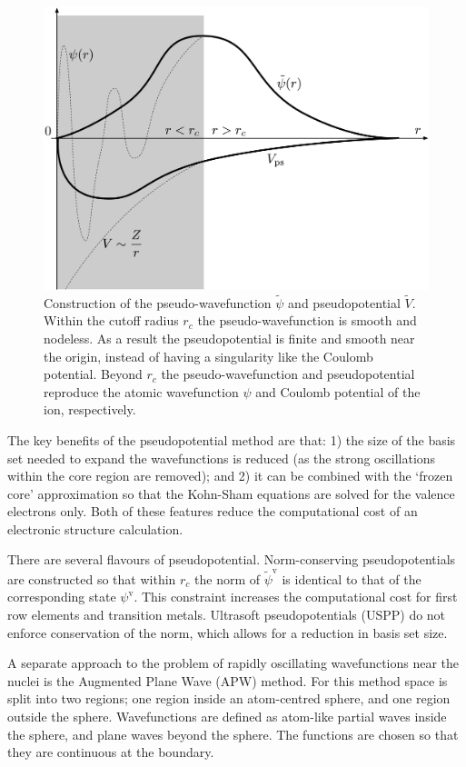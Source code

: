 \begin{figure}[h]
\centering
  \includegraphics[width=0.6\columnwidth]{figures/ch3/ppfigure.png}
  \caption[Construction of the pseudo-wavefunction and pseudopotential]{Construction of the pseudo-wavefunction $\tilde{\psi}$ and pseudopotential $\tilde{V}$. Within the cutoff radius $r_c$ the pseudo-wavefunction is smooth and nodeless. As a result the pseudopotential is finite and smooth near the origin, instead of having a singularity like the Coulomb potential. Beyond $r_c$ the pseudo-wavefunction and pseudopotential reproduce the atomic wavefunction $\psi$ and Coulomb potential of the ion, respectively.}
  \label{ppfigure}
\end{figure}

The key benefits of the pseudopotential method are that: 1) the size of the basis set needed to expand the wavefunctions is reduced (as the strong oscillations within the core region are removed); and 2) it can be combined with the `frozen core' approximation so that the Kohn-Sham equations are solved for the valence electrons only. Both of these features reduce the computational cost of an electronic structure calculation.

There are several flavours of pseudopotential. Norm-conserving pseudopotentials are constructed so that within $r_c$ the norm of $\tilde{\psi}^\mathrm{v}$ is identical to that of the corresponding state $\psi^\mathrm{v}$. This constraint increases the computational cost for first row elements and transition metals. Ultrasoft pseudopotentials (USPP)\autocite{Vanderbilt1990} do not enforce conservation of the norm, which allows for a reduction in basis set size. 

A separate approach to the problem of rapidly oscillating wavefunctions near the nuclei is the Augmented Plane Wave (APW) method.\autocite{Andersen1975} For this method space is split into two regions; one region inside an atom-centred sphere, and one region outside the sphere. Wavefunctions are defined as atom-like partial waves inside the sphere, and plane waves beyond the sphere. The functions are chosen so that they are continuous at the boundary.

